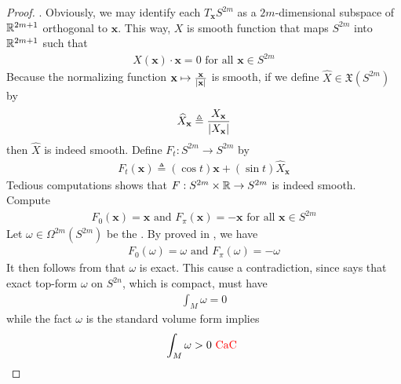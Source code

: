 \documentclass{report}
\begin{document}
\begin{proof}
. Obviously, we may identify each $T_\textbf{x}S^{2m}$ as a $2m$-dimensional subspace of  $\mathbb{R}^{2m+1}$ orthogonal to $\textbf{x}$. This way, $X$ is smooth function that maps  $S^{2m}$ into $\mathbb{R}^{2m+1}$ such that 
\begin{align*}
X(\textbf{x})\cdot \textbf{x}=0\text{ for all }\textbf{x} \in S^{2m}
\end{align*}
Because the normalizing function $\textbf{x}\mapsto \frac{\textbf{x}}{\left|\textbf{x}\right|}$ is smooth, if we define $\widehat{X}\in \mathfrak{X}(S^{2m})$ by 
\begin{align*}
\widehat{X}_\textbf{x}\triangleq \frac{X_\textbf{x}}{\left|X_\textbf{x}\right|}
\end{align*}
then $\widehat{X}$ is indeed smooth. Define $F_t:S^{2m}\rightarrow S^{2m}$ by 
\begin{align*}
F_t(\textbf{x})\triangleq (\cos t)\textbf{x}+ (\sin t)\widehat{X}_\textbf{x}
\end{align*}
Tedious computations shows that $F:S^{2m}\times \mathbb{R} \rightarrow S^{2m}$ is indeed smooth. Compute 
\begin{align*}
F_0(\textbf{x})=\textbf{x}\text{ and }F_\pi  (\textbf{x})=-\textbf{x}\text{ for all }\textbf{x}\in S^{2m}
\end{align*}
Let $\omega \in \Omega^{2m}(S^{2m})$ be the . By  proved in , we have 
\begin{align*}
F_0(\omega)=\omega\text{ and }F_\pi  (\omega)=-\omega
\end{align*}
It then follows from  that $\omega$ is exact. This cause a contradiction, since  says that exact top-form $\omega$ on $S^{2n}$, which is compact, must have 
\begin{align*}
\int_M \omega =0
\end{align*}
while the fact $\omega$ is the standard volume form implies 
\begin{align*}
\int_M \omega> 0 \text{ \textcolor{red}{CaC} }
\end{align*}
\end{proof}
\end{document}
